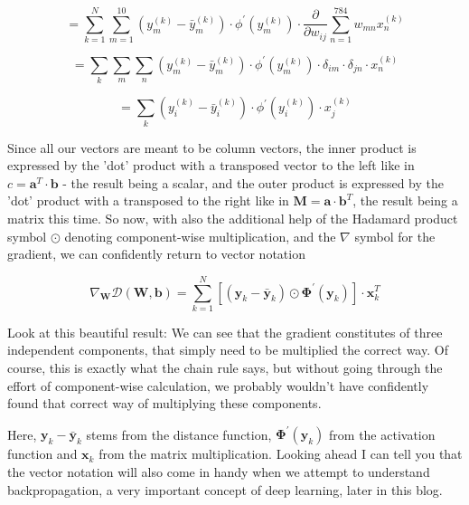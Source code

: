 \documentclass[]{report}
\begin{document}
\begin{equation}\label{eq:170}
= \sum_{k=1}^N \sum_{m=1}^{10}
(y_m^{(k)} - \bar{y}_m^{(k)})
\cdot
\phi^{\prime}(y_m^{(k)}) \cdot
\frac{\partial}{\partial w_{ij}}\sum_{n=1}^{784} w_{mn} x^{(k)}_n
\end{equation}

\begin{equation}
=\sum_k \sum_m \sum_n
(y_m^{(k)} - \bar{y}_m^{(k)})
\cdot
\phi^{\prime}(y_m^{(k)}) \cdot
\delta_{im} \cdot \delta_{jn} \cdot x^{(k)}_n
\end{equation}

\begin{equation}
= \sum_k
(y_i^{(k)} - \bar{y}_i^{(k)})
\cdot
\phi^{\prime}(y_i^{(k)}) \cdot
x^{(k)}_j
\end{equation}

Since all our vectors are meant to be column vectors, the inner product is expressed by the 'dot' product with a transposed vector to the left like in \(c = \mathbf{a}^T \cdot \mathbf{b} \) - the result being a scalar, and the outer product is expressed by the 'dot' product with a transposed to the right like in \(\mathbf{M} = \mathbf{a} \cdot \mathbf{b}^T \), the result being a matrix this time.
So now, with also the additional help of the Hadamard product symbol \(\odot \)  denoting component-wise multiplication, and the \(\nabla\) symbol for the gradient, we can confidently return to vector notation

\begin{equation} \label{eq:180}
\nabla_{\mathbf{W}} \mathcal{D}(\mathbf{W}, \mathbf{b})=
\sum_{k=1}^N \left[ ( \mathbf{y}_k - \bar{\mathbf{y}}_k    )  \odot \mathbf{\Phi^{\prime}}(\mathbf{y}_k) \right]
\cdot \mathbf{x}_k^T
\end{equation}

Look at this beautiful result: We can see that the gradient constitutes of three independent components, that simply need to be multiplied the correct way. Of course, this is exactly what the chain rule says, but without going through the effort of component-wise calculation, we probably wouldn't have confidently found that correct way of multiplying these components.

Here, \( \mathbf{y}_k - \bar{\mathbf{y}}_k\) stems from the distance function, \( \mathbf{\Phi^{\prime}}(\mathbf{y}_k)\) from the activation function and \(\mathbf{x}_k\) from the matrix multiplication. Looking ahead I can tell you that the vector notation will also come in handy when we attempt to understand backpropagation, a very important concept of deep learning, later in this blog.
\end{document}
